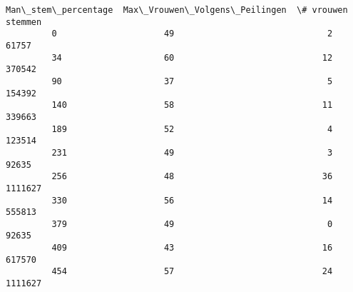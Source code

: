 \documentclass{article}
\begin{document}
\begin{Verbatim}[commandchars=\\\{\}]
              Man\_stem\_percentage  Max\_Vrouwen\_Volgens\_Peilingen  \# vrouwen stemmen  
         0                     49                              2              61757  
         34                    60                             12             370542  
         90                    37                              5             154392  
         140                   58                             11             339663  
         189                   52                              4             123514  
         231                   49                              3              92635  
         256                   48                             36            1111627  
         330                   56                             14             555813  
         379                   49                              0              92635  
         409                   43                             16             617570  
         454                   57                             24            1111627  
\end{Verbatim}
        
\end{document}
